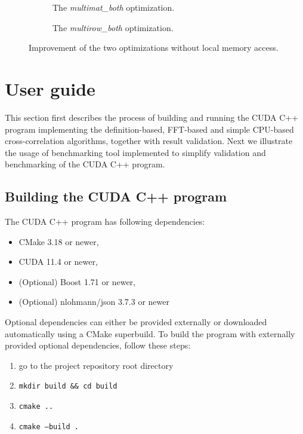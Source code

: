 \begin{figure}[ht]
	\centering	
	\begin{subfigure}{0.45\textwidth}
		\centering
		\def\svgwidth{\textwidth}
		
		\caption{The \textit{multimat\_both} optimization.}
		\label{fig:multimat_both_speedup}
	\end{subfigure}
	\hfill
	\begin{subfigure}{0.45\textwidth}
		\centering
		\def\svgwidth{\textwidth}
		
		\caption{The \textit{multirow\_both} optimization.}
		\label{fig:multirow_both_speedup}
	\end{subfigure}
	
	\caption{Improvement of the two optimizations without local memory access.}
	\label{fig:speedup_local_mem}
\end{figure}



\chapter{User guide}
This section first describes the process of building and running the CUDA C++ program implementing the definition-based, FFT-based and simple CPU-based cross-correlation algorithms, together with result validation. Next we illustrate the usage of benchmarking tool implemented to simplify validation and benchmarking of the CUDA C++ program.

\section{Building the CUDA C++ program}
The CUDA C++ program has following dependencies:
\begin{itemize}
	\item CMake 3.18 or newer,
	\item CUDA 11.4 or newer,
	\item (Optional) Boost 1.71 or newer,
	\item (Optional) nlohmann/json 3.7.3 or newer
\end{itemize}

Optional dependencies can either be provided externally or downloaded automatically using a CMake superbuild. To build the program with externally provided optional dependencies, follow these steps:
\begin{enumerate}
	\item go to the project repository root directory
	\item \texttt{mkdir build \&\& cd build}
	\item \texttt{cmake ..}
	\item \texttt{cmake --build .}
\end{enumerate}

